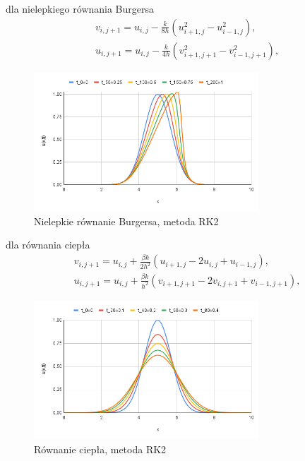 \documentclass[12pt, a4paper]{article}
\begin{document}
dla nielepkiego równania Burgersa
\begin{equation}
\begin{split}
& v_{i,j+1}=u_{i,j}-\frac{k}{8h}(u_{i+1,j}^{2}-u_{i-1,j}^{2}),\\
& u_{i,j+1}=u_{i,j}-\frac{k}{4h}(v_{i+1,j+1}^{2}-v_{i-1,j+1}^{2}),
\end{split}
\end{equation}
\begin{figure}[h]
\caption{Nielepkie równanie Burgersa, metoda RK2}
\centering
\includegraphics[width=0.75\textwidth]{5}
\end{figure}
\newpage
\newpage

dla równania ciepła
\begin{equation}
\begin{split}
& v_{i,j+1}=u_{i,j}+\frac{\beta k}{2h^{2}}(u_{i+1,j}-2u_{i,j}+u_{i-1,j}),\\
& u_{i,j+1}=u_{i,j}+\frac{\beta k}{h^{2}}(v_{i+1,j+1}-2v_{i,j+1}+v_{i-1,j+1}),
\end{split}
\end{equation}
\begin{figure}[h]
\caption{Równanie ciepła, metoda RK2}
\centering
\includegraphics[width=0.75\textwidth]{6}
\end{figure}
\end{document}
